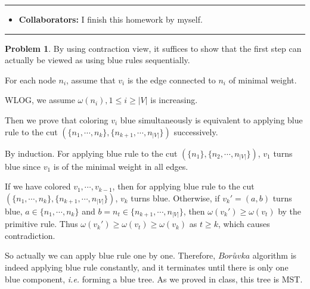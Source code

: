 \documentclass[a4paper]{article}
\theoremstyle{definition}
\newtheorem{problem}{Problem}
\theoremstyle{plain}
\numberwithin{equation}{problem}
\newcommand{\ie}{ \textit{ i.e. } }
\begin{document}
\courseheader
{}
\rule{\textwidth}{1pt}
\begin{itemize}
\item {\bf Collaborators: \/}
  I finish this homework by myself. 
\end{itemize}
\rule{\textwidth}{1pt}

\vspace{2em}
 
\sloppy
{}

\begin{problem}
  By using contraction view, it suffices to show that the first step can  actually be viewed as using blue rules sequentially.

  For each node  $ n_i $, assume that  $ v_i $ is the edge connected to  $ n_i $ of minimal weight.
  
  WLOG, we assume  $ \omega(n_i),1 \leq i \geq |V| $  is increasing.
  
  Then we prove that coloring  $ v_i $ blue  simultaneously is equivalent to applying blue rule to the cut  $ (\{n_1,\cdots,n_k\},\{n_{k+1},\cdots,n_{|V|}\}) $ successively.

  By induction. For applying blue rule to the cut  $ (\{n_1\},\{n_2,\cdots,n_{|V|}\}) $,  $ v_1 $ turns blue since  $ v_1 $ is of the minimal weight in all  edges.
  
  If we have colored  $ v_1,\cdots,v_{k-1} $, then for applying blue rule to the cut  $ (\{n_1,\cdots,n_k\},\{n_{k+1},\cdots,n_{|V|}\}) $,  $ v_k $ turns blue. Otherwise, if  $ v_k'=(a,b) $ turns blue,  $ a\in \{n_1,\cdots,n_k\} $ and  $ b=n_t\in \{n_{k+1},\cdots,n_{|V|}\} $, then  $ \omega(v_k') \geq \omega(v_{t}) $ by the primitive rule. Thus  $ \omega(v_k') \geq \omega(v_t)  \geq \omega(v_k) $ as  $ t \geq k $, which causes contradiction.

  So actually we can apply blue rule one by one. Therefore,  $ Bor\overset{\circ    }{u}vka $ algorithm is indeed applying blue rule constantly, and it terminates until there is only one blue component, \ie forming a blue tree. As we proved in class, this tree is MST.
\end{problem}
\end{document}
